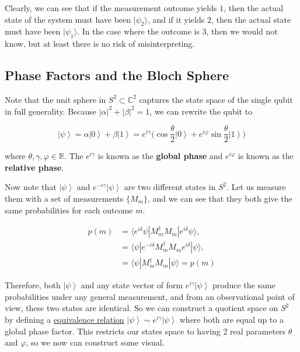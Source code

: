 \documentclass{article}
\newcommand{\ket}[1]{\ensuremath{\left|#1\right\rangle}}
\newcounter{definition}[section]
\begin{document}
      Clearly, we can see that if the measurement outcome yields $1$, then the actual state of the system must have been $|\psi_2\rangle$, and if it yields $2$, then the actual state must have been $|\psi_1 \rangle$. In the case where the outcome is $3$, then we would not know, but at least there is no risk of misinterpreting.  

  \subsection{Phase Factors and the Bloch Sphere}

    \begin{definition}
      \label{def:global-and-relative-phase}
      Note that the unit sphere in $S^2 \subset \mathbb{C}^2$ captures the state space of the single qubit in full generality. Because $|\alpha|^2 + |\beta|^2 = 1$, we can rewrite the qubit to 

      \begin{equation}
        \ket{\psi} = \alpha \ket{0} + \beta \ket{1} = e^{i \gamma} \bigg( \cos{\frac{\theta}{2}} \ket{0} + e^{i \varphi} \sin{\frac{\theta}{2}} \ket{1} \bigg) 
        \label{eq:global_phase}
      \end{equation}

      where $\theta, \gamma, \varphi \in \mathbb{R}$. The $e^{i \gamma}$ is known as the \textbf{global phase} and $e^{i \varphi}$ is known as the \textbf{relative phase}. 
    \end{definition}

    Now note that $\ket{\psi}$ and $e^{- i \gamma} \ket{\psi}$ are two different states in $S^2$. Let us measure them with a set of measurements $\{M_m\}$, and we can see that they both give the same probabilities for each outcome $m$. 
    
    \begin{align*}
      p(m) & = \langle e^{i \delta} \psi | M_m^\dagger M_m | e^{i \delta} \psi \rangle, \\
      & = \langle \psi | e^{-i \delta} M_m^\dagger M_m e^{i \delta} | \psi \rangle, \\
      & = \langle \psi | M_m^\dagger M_m | \psi \rangle = p(m)
    \end{align*}

    Therefore, both $\ket{\psi}$ and any state vector of form $e^{i \gamma} \ket{\psi}$ produce the same probabilities under any general measurement, and from an observational point of view, these two states are identical. So we can construct a quotient space on $S^2$ by defining a \hyperref[st-def:equivalence_relation]{equivalence relation} $\ket{\psi} \sim e^{i\gamma} \ket{\psi}$ where both are equal up to a global phase factor. This restricts our states space to having 2 real parameters $\theta$ and $\varphi$, so we now can construct some visual. 
\end{document}

